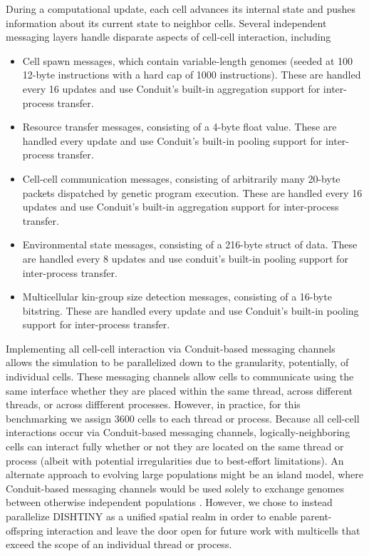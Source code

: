 During a computational update, each cell advances its internal state and pushes information about its current state to neighbor cells.
Several independent messaging layers handle disparate aspects of cell-cell interaction, including
\begin{itemize}
  \item Cell spawn messages, which contain variable-length genomes (seeded at 100 12-byte instructions with a hard cap of 1000 instructions). These are handled every 16 updates and use Conduit's built-in aggregation support for inter-process transfer.
  \item Resource transfer messages, consisting of a 4-byte float value. These are handled every update and use Conduit's built-in pooling support for inter-process transfer.
  \item Cell-cell communication messages, consisting of arbitrarily many 20-byte packets dispatched by genetic program execution. These are handled every 16 updates and use Conduit's built-in aggregation support for inter-process transfer.
  \item Environmental state messages, consisting of a 216-byte struct of data. These are handled every 8 updates and use conduit's built-in pooling support for inter-process transfer.
  \item Multicellular kin-group size detection messages, consisting of a 16-byte bitstring. These are handled every update and use Conduit's built-in pooling support for inter-process transfer.
\end{itemize}

Implementing all cell-cell interaction via Conduit-based messaging channels allows the simulation to be parallelized down to the granularity, potentially, of individual cells.
These messaging channels allow cells to communicate using the same interface whether they are placed within the same thread, across different threads, or across diffferent processes.
However, in practice, for this benchmarking we assign 3600 cells to each thread or process.
Because all cell-cell interactions occur via Conduit-based messaging channels, logically-neighboring cells can interact fully whether or not they are located on the same thread or process (albeit with potential irregularities due to best-effort limitations).
An alternate approach to evolving large populations might be an island model, where Conduit-based messaging channels would be used solely to exchange genomes between otherwise independent populations \citep{bennett1999building}.
However, we chose to instead parallelize DISHTINY as a unified spatial realm in order to enable parent-offspring interaction and leave the door open for future work with multicells that exceed the scope of an individual thread or process.
